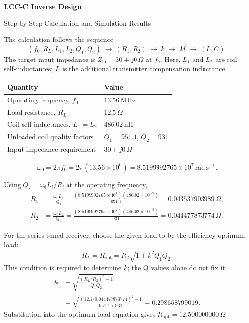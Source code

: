 \documentclass[11pt,a4paper]{article}
\newcommand{\step}[1]{\par\vspace{8pt}{\large\bfseries #1}\par\vspace{2pt}}
\newcommand{\ohm}{\,\Omega}
\newcommand{\nH}{\,\mathrm{nH}}
\newcommand{\radsec}{\,\mathrm{rad\,s^{-1}}}
\begin{document}
{\LARGE\bfseries LCC-C Inverse Design}\par
{\large Step-by-Step Calculation and Simulation Results}\par
\vspace{3pt}
The calculation follows the sequence
\[
 (f_0,R_L,L_1,L_2,Q_1,Q_2)
 \;\longrightarrow\; (R_1,R_2)
 \;\longrightarrow\; k
 \;\longrightarrow\; M
 \;\longrightarrow\; (L,C).
\]
The target input impedance is $Z_{\mathrm{in}}=30+j0\ohm$ at $f_0$.
Here, $L_1$ and $L_2$ are coil self-inductances; $L$ is the additional
transmitter compensation inductance.

\step{1. Known parameters and angular frequency}
\begin{center}
\begin{tabular}{@{}ll@{}}
\toprule
Quantity & Value \\
\midrule
Operating frequency, $f_0$ & $13.56\,\mathrm{MHz}$ \\
Load resistance, $R_L$ & $12.5\ohm$ \\
Coil self-inductances, $L_1=L_2$ & $486.02\nH$ \\
Unloaded coil quality factors & $Q_1=951.1$, $Q_2=931$ \\
Input impedance requirement & $30+j0\ohm$ \\
\bottomrule
\end{tabular}
\end{center}
\[
 \omega_0=2\pi f_0=2\pi(13.56\times10^6)
          =8.5199992765\times10^7\radsec.
\]

\step{2. Winding resistances from the unloaded Q values}
Using $Q_i=\omega_0L_i/R_i$ at the operating frequency,
\begin{align*}
 R_1&=\frac{\omega_0L_1}{Q_1}
     =\frac{(8.5199992765\times10^7)(486.02\times10^{-9})}{951.1}
     =0.043537903989\ohm,\\[3pt]
 R_2&=\frac{\omega_0L_2}{Q_2}
     =\frac{(8.5199992765\times10^7)(486.02\times10^{-9})}{931}
     =0.044477873774\ohm.
\end{align*}

\step{3. Coupling coefficient k from the optimum-load condition}
For the series-tuned receiver, choose the given load to be the
efficiency-optimum load:
\[
 R_L=R_{\mathrm{opt}}=R_2\sqrt{1+k^2Q_1Q_2}.
\]
This condition is required to determine $k$; the Q values alone do not fix it.
\begin{align*}
 k&=\sqrt{\frac{(R_L/R_2)^2-1}{Q_1Q_2}}\\
  &=\sqrt{\frac{(12.5/0.044477873774)^2-1}{951.1\times931}}
   =\boxed{0.298658799019}.
\end{align*}
Substitution into the optimum-load equation gives
$R_{\mathrm{opt}}=12.500000000\ohm$.
\end{document}
